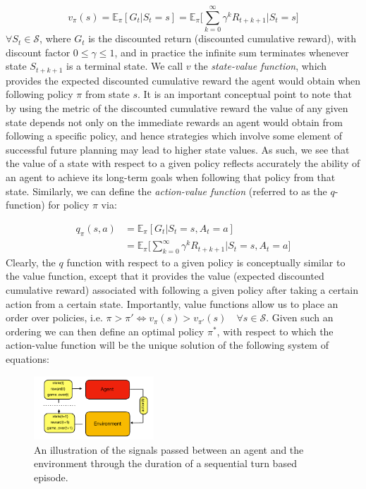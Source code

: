 \documentclass[twocolumn,preprintnumbers,amsmath,amssymb,notitlepage,nofootinbib,longbibliography,superscriptaddress,aps,pra,10pt]{revtex4-1}
\begin{document}
    \begin{equation}
        v_{\pi}(s) = \mathbb{E}_{\pi}[G_t|S_t = s]  = \mathbb{E}_{\pi} \Big[\sum_{k = 0}^{\infty}\gamma^k R_{t+k+1}\Big| S_t = s \Big] 
    \end{equation}
    $\forall S_t \in \mathcal{S}$, where $G_t$ is the discounted return (discounted cumulative reward), with discount factor $0 \leq \gamma \leq 1$, and in practice the infinite sum terminates whenever state $S_{t+k+1}$ is a terminal state. 
    We call $v$ the \textit{state-value function}, which provides the expected discounted cumulative reward the agent would obtain when following policy $\pi$ from state $s$. 
    It is an important conceptual point to note that by using the metric of the discounted cumulative reward the value of any given state depends not only on the immediate rewards an agent would obtain from following a specific policy, and hence strategies which involve some element of successful future planning may lead to higher state values. 
    As such, we see that the value of a state with respect to a given policy reflects accurately the ability of an agent to achieve its long-term goals when following that policy from that state. 
    Similarly, we can define the \textit{action-value function}  (referred to as the $q$-function) for policy $\pi$ via:

    \begin{align}
        q_{\pi}(s,a) &= \mathbb{E}_{\pi}[G_t|S_t = s, A_t = a]  \\
        & = \mathbb{E}_{\pi} \Big[\sum_{k = 0}^{\infty}\gamma^k R_{t+k+1}\Big| S_t = s, A_t = a \Big]
    \end{align}
    Clearly, the $q$ function with respect to a given policy is conceptually similar to the value function, except that it provides the value (expected discounted cumulative reward) associated with following a given policy after taking a certain action from a certain state. 
    Importantly, value functions allow us to place an order over policies, i.e. $\pi > \pi' \iff v_{\pi}(s) > v_{\pi'}(s)\quad \forall s \in \mathcal{S} $. 
    Given such an ordering we can then define an optimal policy $\pi^*$, with respect to which the action-value function will be the unique solution of the following system of equations:

    \begin{figure}
      \centering
          \includegraphics[width=0.4\textwidth]{figures/agent_environment.pdf}
      \caption{An illustration of the signals passed between an agent and the environment through the duration of a sequential turn based episode.}\label{f:agent_environment}
    \end{figure}
\end{document}
